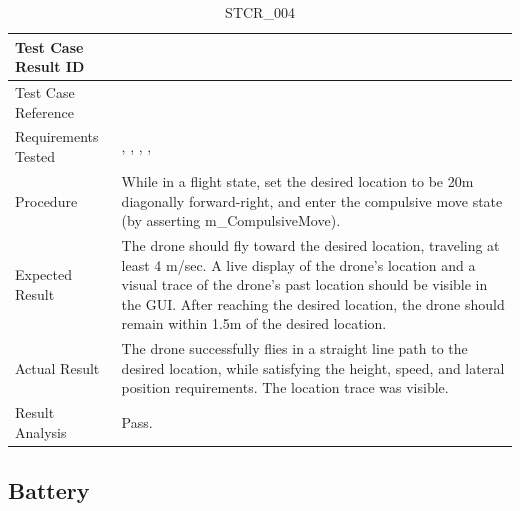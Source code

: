 \documentclass[12pt, titlepage]{article}
\begin{document}
\begin{table}[!h]
\begin{center}
\caption {STCR\_004}
\label{tab:STCR_004}
\begin{tabular}{ | m{3.2cm} | m{12.2cm} | } 
\hline
Test Case Result ID & \nameref{tab:STCR_004} \\ 
\hline
Test Case Reference & \nameref{tab:STC_004}  \\ 
\hline
Requirements Tested &  \nameref{TRANS_005}, \nameref{PERF_008}, \nameref{PERF_006}, \nameref{USE_001}, \nameref{PERF_003}
\\ 
\hline


\hline
Procedure & While in a flight state, set the desired location to be 20m diagonally forward-right, and enter the compulsive move state (by asserting m\_CompulsiveMove).    \\ 
\hline
Expected Result & The drone should fly toward the desired location, traveling at least 4 m/sec. A live display of the drone's location and a visual trace of the drone's past location should be visible in the GUI. After reaching the desired location, the drone should remain within 1.5m of the desired location.    \\ 
\hline
Actual Result & The drone successfully flies in a straight line path to the desired location, while satisfying the height, speed, and lateral position requirements. The location trace was visible. \\ 
\hline
Result Analysis &  Pass. \\ 
\hline
\end{tabular}
\end{center}
\end{table}

\clearpage

\subsection{Battery}
\end{document}
